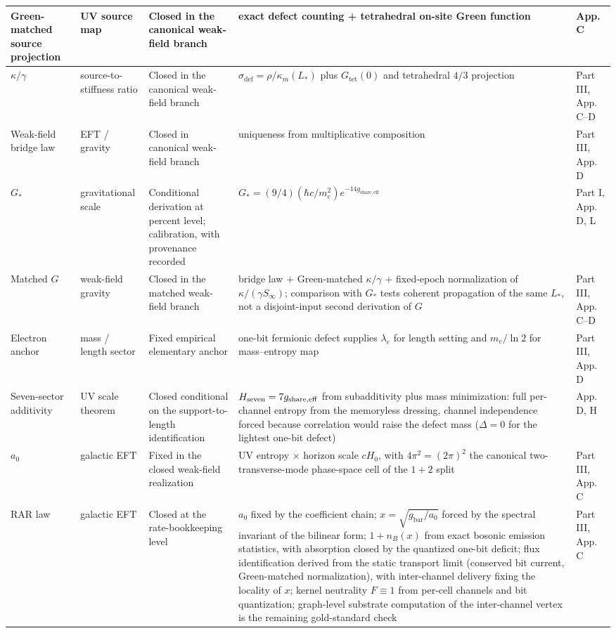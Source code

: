 \documentclass[11pt]{article}
\begin{document}
\begin{longtable}{|L{0.18\textwidth}|L{0.13\textwidth}|L{0.16\textwidth}|L{0.33\textwidth}|L{0.13\textwidth}|}
\hline
Green-matched source projection & UV source map & Closed in the canonical weak-field branch & exact defect counting + tetrahedral on-site Green function & App. C \\
\hline
$\kappa/\gamma$ & source-to-stiffness ratio & Closed in the canonical weak-field branch & $\sigma_{\mathrm{def}}=\rho/\kappa_m(L_*)$ plus $G_{\mathrm{tet}}(0)$ and tetrahedral $4/3$ projection & Part III, App. C--D \\
\hline
Weak-field bridge law & EFT / gravity & Closed in canonical weak-field branch & uniqueness from multiplicative composition & Part III, App. D \\
\hline
$G_*$ & gravitational scale & Conditional derivation at percent level; calibration, with provenance recorded & $G_*=(9/4)(\hbar c/m_e^2)e^{-14g_{\mathrm{share,eff}}}$ & Part I, App. D, L \\
\hline
Matched $G$ & weak-field gravity & Closed in the matched weak-field branch & bridge law + Green-matched $\kappa/\gamma$ + fixed-epoch normalization of $\kappa/(\gamma S_\infty)$; comparison with $G_*$ tests coherent propagation of the same $L_*$, not a disjoint-input second derivation of $G$ & Part III, App. C--D \\
\hline
Electron anchor & mass / length sector & Fixed empirical elementary anchor & one-bit fermionic defect supplies $\lambda_e$ for length setting and $m_e/\ln2$ for mass--entropy map & Part III, App. D \\
\hline
Seven-sector additivity & UV scale theorem & Closed conditional on the support-to-length identification & $H_{\rm seven}=7g_{\mathrm{share,eff}}$ from subadditivity plus mass minimization: full per-channel entropy from the memoryless dressing, channel independence forced because correlation would raise the defect mass ($\Delta=0$ for the lightest one-bit defect) & App. D, H \\
\hline
$a_0$ & galactic EFT & Fixed in the closed weak-field realization & UV entropy $\times$ horizon scale $cH_0$, with $4\pi^2=(2\pi)^2$ the canonical two-transverse-mode phase-space cell of the $1+2$ split & Part III, App. C \\
\hline
RAR law & galactic EFT & Closed at the rate-bookkeeping level & $a_0$ fixed by the coefficient chain; $x=\sqrt{g_{\mathrm{bar}}/a_0}$ forced by the spectral invariant of the bilinear form; $1+n_B(x)$ from exact bosonic emission statistics, with absorption closed by the quantized one-bit deficit; flux identification derived from the static transport limit (conserved bit current, Green-matched normalization), with inter-channel delivery fixing the locality of $x$; kernel neutrality $F\equiv1$ from per-cell channels and bit quantization; graph-level substrate computation of the inter-channel vertex is the remaining gold-standard check & Part III, App. C \\

\end{longtable}
\end{document}
